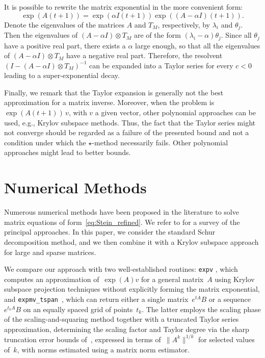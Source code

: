 \documentclass[final,1p,times,number]{elsarticle}
\theoremstyle{plain}%
\begin{document}
It is possible to rewrite the matrix exponential in the more convenient form:
\[\exp(A(t+1)) = \exp(\alpha I (t+1)) \exp((A-\alpha I)(t+1)).\]
Denote the eigenvalues of the matrices $A$ and $T_M$, respectively, by $\lambda_i$ and $\theta_j$. Then the eigenvalues of \((A-\alpha I)\otimes T_M\) are of the form \( (\lambda_i - \alpha) \theta_j\). Since all $\theta_j$ have a positive real part, there exists a \(\alpha\) large enough, so that all the eigenvalues of \((A-\alpha I)\otimes T_M \) have a negative real part. Therefore, the resolvent \((I-(A-\alpha I)\otimes T_M)^{-1}\) can be expanded into a Taylor series for every $c<0$ leading to a super-exponential decay.

Finally, we remark that the Taylor expansion is generally not the best approximation for a matrix inverse. Moreover, when the problem is \(\exp(A(t+1))\, v\), with \(v\) a given vector, other polynomial approaches can be used, e.g., Krylov subspace methods. Thus, the fact that the Taylor series might not converge should be regarded as a failure of the presented bound and not a condition under which the $\star$-method necessarily fails. Other polynomial approaches might lead to better bounds.


\section{Numerical Methods}\label{sec3}
Numerous numerical methods have been proposed in the literature to solve matrix equations of form~\eqref{eq:Stein_refined}. We refer to \cite{simoncini2016computational} for a survey of the principal approaches. In this paper, we consider the standard Schur decomposition method, and we then combine it with a Krylov subspace approach for large and sparse matrices.

We compare our approach with two well-established routines: \texttt{expv} \cite{Sidje}, which computes an approximation of~$\exp(A)v$ for a general matrix~$A$ using Krylov subspace projection techniques without explicitly forming the matrix exponential, and \texttt{expmv\_tspan}~\cite{al2011computing}, which can return either a single matrix~$e^{tA}B$ or a sequence~$e^{t_kA}B$ on an equally spaced grid of points~$t_k$. The latter employs the scaling phase of the scaling-and-squaring method together with a truncated Taylor series approximation, determining the scaling factor and Taylor degree via the sharp truncation error bounds of~\cite{al2009sharp}, expressed in terms of~$\|A^k\|^{1/k}$ for selected values of~$k$, with norms estimated using a matrix norm estimator.
\end{document}
